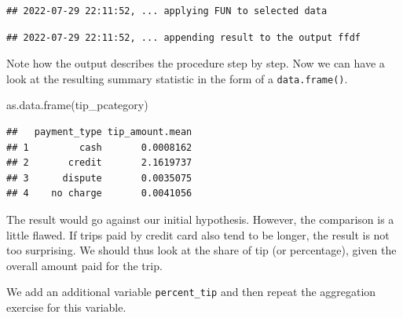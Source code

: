\documentclass[
  12pt,
]{style/krantz}
\newenvironment{Shaded}{\begin{snugshade}}{\end{snugshade}}
\newcommand{\AttributeTok}[1]{\textcolor[rgb]{0.77,0.63,0.00}{#1}}
\newcommand{\CommentTok}[1]{\textcolor[rgb]{0.56,0.35,0.01}{\textit{#1}}}
\newcommand{\ConstantTok}[1]{\textcolor[rgb]{0.00,0.00,0.00}{#1}}
\newcommand{\ControlFlowTok}[1]{\textcolor[rgb]{0.13,0.29,0.53}{\textbf{#1}}}
\newcommand{\DecValTok}[1]{\textcolor[rgb]{0.00,0.00,0.81}{#1}}
\newcommand{\FunctionTok}[1]{\textcolor[rgb]{0.00,0.00,0.00}{#1}}
\newcommand{\NormalTok}[1]{#1}
\newcommand{\OtherTok}[1]{\textcolor[rgb]{0.56,0.35,0.01}{#1}}
\newcommand{\SpecialCharTok}[1]{\textcolor[rgb]{0.00,0.00,0.00}{#1}}
\begin{document}
\begin{verbatim}
## 2022-07-29 22:11:52, ... applying FUN to selected data
\end{verbatim}

\begin{verbatim}
## 2022-07-29 22:11:52, ... appending result to the output ffdf
\end{verbatim}

Note how the output describes the procedure step by step. Now we can have a look at the resulting summary statistic in the form of a \texttt{data.frame()}.

\begin{Shaded}
\begin{Highlighting}[]
\FunctionTok{as.data.frame}\NormalTok{(tip\_pcategory)}
\end{Highlighting}
\end{Shaded}

\begin{verbatim}
##   payment_type tip_amount.mean
## 1         cash       0.0008162
## 2       credit       2.1619737
## 3      dispute       0.0035075
## 4    no charge       0.0041056
\end{verbatim}

The result would go against our initial hypothesis. However, the comparison is a little flawed. If trips paid by credit card also tend to be longer, the result is not too surprising. We should thus look at the share of tip (or percentage), given the overall amount paid for the trip.

We add an additional variable \texttt{percent\_tip} and then repeat the aggregation exercise for this variable.

\begin{Shaded}
\end{Shaded}
\end{document}
